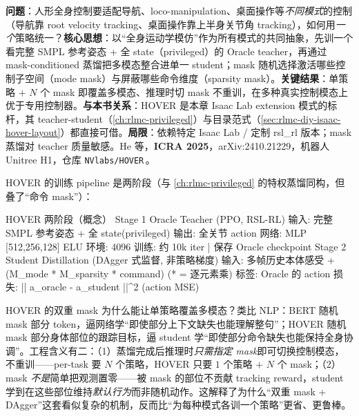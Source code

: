 \begin{paper}\label{paper:rlmc-diy-hover}
\textbf{问题}：人形全身控制要适配导航、loco-manipulation、桌面操作等\emph{不同模式}的控制（导航靠 root velocity tracking、桌面操作靠上半身关节角 tracking），如何用\emph{一个}策略统一？\textbf{核心思想}：以“全身运动学模仿”作为所有模式的共同抽象，先训一个看完整 SMPL 参考姿态 + 全 state（privileged）的 Oracle teacher，再通过 mask-conditioned 蒸馏把多模态整合进单一 student；mask 随机选择激活哪些控制子空间（mode mask）与屏蔽哪些命令维度（sparsity mask）。\textbf{关键结果}：单策略 $+$ $N$ 个 mask 即覆盖多模态、推理时切 mask 不重训，在多种真实控制模态上优于专用控制器。\textbf{与本书关系}：HOVER 是本章 Isaac Lab extension 模式的标杆，其 teacher-student（\cref{ch:rlmc-privileged}）与目录范式（\cref{sec:rlmc-diy-isaac-hover-layout}）都直接可借。\textbf{局限}：依赖特定 Isaac Lab / 定制 rsl\_rl 版本；mask 蒸馏对 teacher 质量敏感。He 等，\textbf{ICRA 2025}，arXiv:2410.21229，机器人 Unitree H1，仓库 \texttt{NVlabs/HOVER}\,\cite{he2025hover}。
\end{paper}

HOVER 的训练 pipeline 是两阶段（与 \cref{ch:rlmc-privileged} 的特权蒸馏同构，但叠了“命令 mask”）：

\begin{codebox}[text]{HOVER 两阶段（概念）}
Stage 1  Oracle Teacher (PPO, RSL-RL)
  输入: 完整 SMPL 参考姿态 + 全 state(privileged)   输出: 全关节 action
  网络: MLP [512,256,128] ELU   环境: 4096   训练: 约 10k iter
        | 保存 Oracle checkpoint
Stage 2  Student Distillation (DAgger 式监督, 非策略梯度)
  输入: 多帧历史本体感受 + (M_mode * M_sparsity * command)   (* = 逐元素乘)
  标签: Oracle 的 action       损失: || a_oracle - a_student ||^2  (action MSE)
\end{codebox}

\begin{insight}\label{ins:rlmc-diy-hovermask}
HOVER 的双重 mask 为什么能让单策略覆盖多模态？类比 NLP：BERT 随机 mask 部分 token，逼网络学“即使部分上下文缺失也能理解整句”；HOVER 随机 mask 部分身体部位的跟踪目标，逼 student 学“即使部分命令缺失也能保持全身协调”。工程含义有二：（1）蒸馏完成后推理时\emph{只需指定 mask}即可切换控制模态，不重训——per-task 要 $N$ 个策略，HOVER 只要 $1$ 个策略 $+$ $N$ 个 mask；（2）mask \emph{不是}简单把观测置零——被 mask 的部位不贡献 tracking reward，student 学到在这些部位维持\emph{默认行为}而非随机动作。这解释了为什么“双重 mask + DAgger”这套看似复杂的机制，反而比“为每种模式各训一个策略”更省、更鲁棒。
\end{insight}

